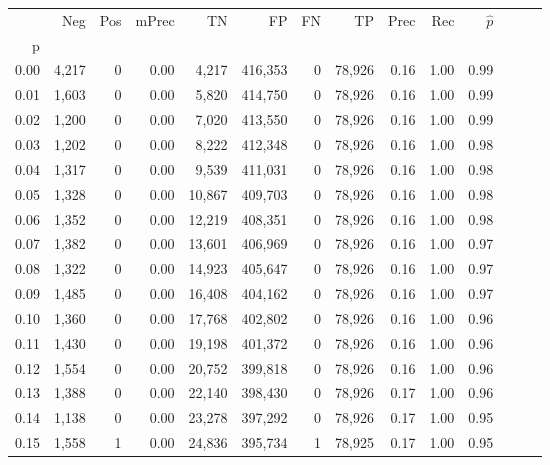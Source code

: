 \begin{tabular}{rrrrrrrrrrrrrr}
\toprule
{} &     Neg &    Pos & mPrec &       TN &       FP &      FN &      TP &  Prec &   Rec & $\hat{p}$ \\
p    &         &        &       &          &          &         &         &       &       &           \\
\midrule
0.00 &   4,217 &      0 &  0.00 &    4,217 &  416,353 &       0 &  78,926 &  0.16 &  1.00 &      0.99 \\
0.01 &   1,603 &      0 &  0.00 &    5,820 &  414,750 &       0 &  78,926 &  0.16 &  1.00 &      0.99 \\
0.02 &   1,200 &      0 &  0.00 &    7,020 &  413,550 &       0 &  78,926 &  0.16 &  1.00 &      0.99 \\
0.03 &   1,202 &      0 &  0.00 &    8,222 &  412,348 &       0 &  78,926 &  0.16 &  1.00 &      0.98 \\
0.04 &   1,317 &      0 &  0.00 &    9,539 &  411,031 &       0 &  78,926 &  0.16 &  1.00 &      0.98 \\
0.05 &   1,328 &      0 &  0.00 &   10,867 &  409,703 &       0 &  78,926 &  0.16 &  1.00 &      0.98 \\
0.06 &   1,352 &      0 &  0.00 &   12,219 &  408,351 &       0 &  78,926 &  0.16 &  1.00 &      0.98 \\
0.07 &   1,382 &      0 &  0.00 &   13,601 &  406,969 &       0 &  78,926 &  0.16 &  1.00 &      0.97 \\
0.08 &   1,322 &      0 &  0.00 &   14,923 &  405,647 &       0 &  78,926 &  0.16 &  1.00 &      0.97 \\
0.09 &   1,485 &      0 &  0.00 &   16,408 &  404,162 &       0 &  78,926 &  0.16 &  1.00 &      0.97 \\
0.10 &   1,360 &      0 &  0.00 &   17,768 &  402,802 &       0 &  78,926 &  0.16 &  1.00 &      0.96 \\
0.11 &   1,430 &      0 &  0.00 &   19,198 &  401,372 &       0 &  78,926 &  0.16 &  1.00 &      0.96 \\
0.12 &   1,554 &      0 &  0.00 &   20,752 &  399,818 &       0 &  78,926 &  0.16 &  1.00 &      0.96 \\
0.13 &   1,388 &      0 &  0.00 &   22,140 &  398,430 &       0 &  78,926 &  0.17 &  1.00 &      0.96 \\
0.14 &   1,138 &      0 &  0.00 &   23,278 &  397,292 &       0 &  78,926 &  0.17 &  1.00 &      0.95 \\
0.15 &   1,558 &      1 &  0.00 &   24,836 &  395,734 &       1 &  78,925 &  0.17 &  1.00 &      0.95 \\

\end{tabular}
